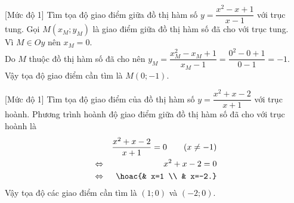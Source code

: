 \begin{bt}%
[Mức độ 1]%
Tìm tọa độ giao điểm giữa đồ thị hàm số $y=\dfrac{x^2-x+1}{x-1}$ với trục tung.
\loigiai
{Gọi $M(x_M;y_M)$ là giao điểm giữa đồ thị hàm số đã cho với trục tung.\\
Vì $M\in Oy$ nên $x_M=0$.\\
Do $M$ thuộc đồ thị hàm số đã cho nên $y_M=\dfrac{x_M^2-x_M+1}{x_M-1}=\dfrac{0^2-0+1}{0-1}=-1$.\\
Vậy tọa độ giao điểm cần tìm là $M(0;-1)$.
}
\end{bt}

\begin{bt}%
[Mức độ 1]
Tìm tọa độ giao điểm của đồ thị hàm số $y=\dfrac{x^2+x-2}{x+1}$ với trục hoành.
\loigiai
{Phương trình hoành độ giao điểm giữa đồ thị hàm số đã cho với trục hoành là \begin{eqnarray*}
&&\dfrac{x^2+x-2}{x+1}=0\qquad (x\neq -1)\\
&\Leftrightarrow & x^2+x-2=0\\
&\Leftrightarrow &\hoac{& x=1 \\ & x=-2.}
\end{eqnarray*}
Vậy tọa độ các giao điểm cần tìm là $(1;0)$ và $(-2;0)$.
}
\end{bt}


